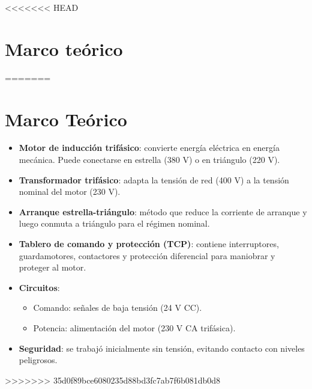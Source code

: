 <<<<<<< HEAD
\section{Marco teórico}
=======
\section{Marco Teórico}
\begin{itemize}
    \item \textbf{Motor de inducción trifásico}: convierte energía eléctrica en energía mecánica. Puede conectarse en estrella (380 V) o en triángulo (220 V).
    \item \textbf{Transformador trifásico}: adapta la tensión de red (400 V) a la tensión nominal del motor (230 V).
    \item \textbf{Arranque estrella-triángulo}: método que reduce la corriente de arranque y luego conmuta a triángulo para el régimen nominal.
    \item \textbf{Tablero de comando y protección (TCP)}: contiene interruptores, guardamotores, contactores y protección diferencial para maniobrar y proteger al motor.
    \item \textbf{Circuitos}: 
    \begin{itemize}
        \item Comando: señales de baja tensión (24 V CC).
        \item Potencia: alimentación del motor (230 V CA trifásica).
    \end{itemize}
    \item \textbf{Seguridad}: se trabajó inicialmente sin tensión, evitando contacto con niveles peligrosos.
\end{itemize}
>>>>>>> 35d0f89bce6080235d88bd3fc7ab7f6b081db0d8
